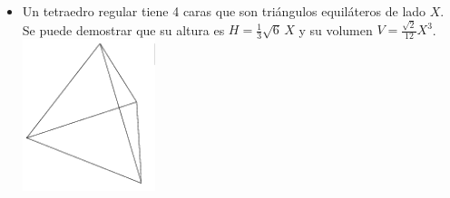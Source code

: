 \documentclass[12pt,a4paper]{article}
\begin{document}
\begin{tcolorbox}[enhanced, breakable,
	colback=fondoazul, colframe=azuloscuro, title=\textbf{RECUERDA QUE...}, breakable]
\begin{itemize}[nosep]
		\item %
		\begin{tcolorbox}[enhanced, frame hidden, boxrule=0pt, colback=fondoazul,
			sidebyside, sidebyside align=top seam, sidebyside gap=8pt,
			righthand width=0.15\textwidth]
			Un tetraedro regular tiene 4 caras que son triángulos equiláteros de lado $X$.
			Se puede demostrar que su altura es $H=\tfrac{1}{3}\sqrt{6}\,X$ y su volumen
			$V=\tfrac{\sqrt{2}}{12}X^3$.
			\tcblower
			\includegraphics[width=\linewidth]{Figuras/fig4.png}
		\end{tcolorbox}
	\end{itemize}
\end{tcolorbox}
\end{document}
